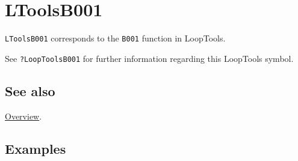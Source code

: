 \documentclass[../FeynHelpersManual.tex]{subfiles}
\begin{document}
\hypertarget{ltoolsb001}{
\section{LToolsB001}\label{ltoolsb001}}

\texttt{LToolsB001} corresponds to the \texttt{B001} function in
LoopTools.

See \texttt{?LoopTools\textasciigrave B001} for further information
regarding this LoopTools symbol.

\subsection{See also}

\hyperlink{toc}{Overview}.

\subsection{Examples}
\end{document}
